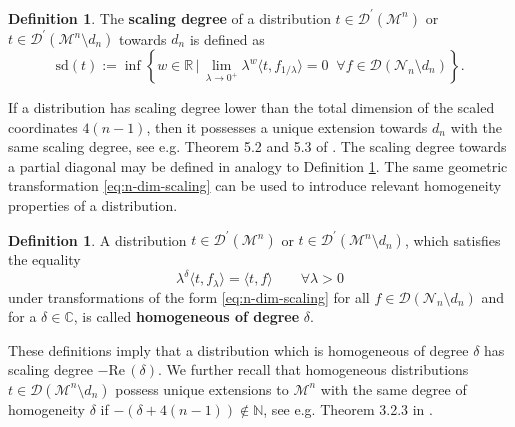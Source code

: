 \documentclass[a4paper,10pt,twoside]{article}
\numberwithin{equation}{section}
\newcounter{and}
\def\M{\mathcal{M}}
\def\N{\mathcal{N}}
\def\D{\mathcal{D}}
\def\Ree{\mathrm{Re}\,}
\def\sd{\mathrm{sd}}
\theoremstyle{plain}
\theoremstyle{definition}
\newtheorem{defi}[theo]{Definition}
\begin{document}
\begin{defi}\label{def:scalingdegree}
The {\bf scaling degree} of a distribution $t\in \D^\prime(\M^n)$ or $t\in \D^\prime(\M^n\setminus d_n)$ towards $d_n$ 
is defined as 
\[
\sd(t) := \inf\left \{w \in \mathbb{R}\,\big|\, \lim_{\lambda \to 0^+}\lambda^{w} \langle t,f_{1/\lambda} \rangle  = 0\;\;\forall f\in\D(\N_n\setminus d_n) \right\}.
\] 
\end{defi}

If a distribution has scaling degree lower than the total dimension of the scaled coordinates $4(n-1)$, then it possesses a unique extension towards $d_n$ with the same scaling degree, see e.g. Theorem 5.2 and 5.3 of \cite{Brunetti-Fredenhagen:2000}. The scaling degree towards a partial diagonal may be defined in analogy to Definition \ref{def:scalingdegree}. The same geometric transformation \eqref{eq:n-dim-scaling} can be used to introduce relevant homogeneity properties of a distribution.

\begin{defi}\label{def:homogeneous}
A distribution $t\in \D^\prime(\M^n)$ or $t\in \D^\prime(\M^n\setminus d_n)$, which satisfies the equality 
\[
\lambda^{\delta} \langle t,f_\lambda \rangle    = \langle t,f \rangle \qquad\forall \lambda >0
\]
under transformations of the form \eqref{eq:n-dim-scaling} for all $f\in\D(\N_n\setminus d_n)$ and for a $\delta\in\mathbb{C}$, is called {\bf homogeneous of degree} $\delta$. 
\end{defi}

These definitions imply that a distribution which is homogeneous of degree $\delta$ has scaling degree $-\Ree(\delta)$. We further recall that homogeneous distributions $t\in\D(\M^n\setminus d_n)$ possess unique extensions to $\M^n$ with the same degree of homogeneity $\delta$ if $-(\delta+4(n-1))\notin \mathbb{N}$, see e.g. Theorem 3.2.3 in \cite{Hormander}.
\end{document}
